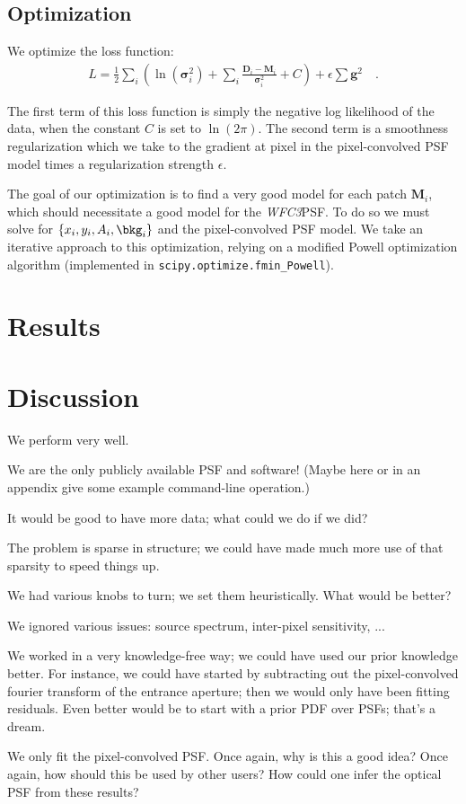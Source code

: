 \documentclass[12pt,letterpaper,preprint]{aastex}
\newcommand{\instrument}[1]{\textsl{#1}}
\newcommand{\vect}[1]{\mathbf{#1}}
\newcommand{\WFC}{\instrument{WFC3}}
\newcommand{\data}{\vect{D}}
\newcommand{\model}{\vect{M}}
\newcommand{\var}{\vect{\sigma}^2}
\newcommand{\gradients}{\vect{g}}
\begin{document}
\subsection{Optimization}

We optimize the loss function:
\begin{eqnarray}
L =  \frac{1}{2}\sum_i\left(\ln(\var_i) + \sum_{i} \frac{\data_i - \model_i}{\var_i} + C\right) + 
\epsilon \sum \gradients^2 
\quad .
\label{eqn:model-noflat}
\end{eqnarray}

\noindent The first term of this loss function is simply the negative log likelihood of the data, 
when the constant $C$ is set to $\ln(2\pi)$.  The second term is a smoothness regularization which 
we take to the gradient at pixel in the pixel-convolved PSF model times a regularization 
strength $\epsilon$.

The goal of our optimization is to find a very good model for each patch $\model_i$, which should 
necessitate a good model for the \WFC PSF.  To do so we must solve for $\{x_i, y_i, A_i, \bkg_i\}$ 
and the pixel-convolved PSF model.  We take an iterative approach to this optimization, relying on  
a modified Powell optimization algorithm (implemented in \texttt{scipy.optimize.fmin_Powell}). 

\section{Results}

\section{Discussion}

We perform very well.

We are the only publicly available PSF and software!
(Maybe here or in an appendix give some example command-line operation.)

It would be good to have more data;
  what could we do if we did?

The problem is sparse in structure;
  we could have made much more use of that sparsity to speed things up.

We had various knobs to turn; we set them heuristically.
What would be better?

We ignored various issues: source spectrum, inter-pixel sensitivity, ...

We worked in a very knowledge-free way;
  we could have used our prior knowledge better.
For instance, we could have started by subtracting out the pixel-convolved fourier transform of the entrance aperture;
  then we would only have been fitting residuals.
Even better would be to start with a prior PDF over PSFs;
  that's a dream.

We only fit the pixel-convolved PSF.
Once again, why is this a good idea?
Once again, how should this be used by other users?
How could one infer the optical PSF from these results?
\end{document}
